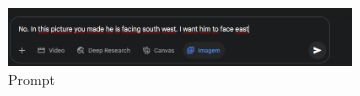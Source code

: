 \begin{figure}[htbp]
    \centering
    \caption{\small Processo da geração 16 do sprite em side view no Gemini Pro em julho/2025}
    \label{fig:geminiPro16}

    \begin{subfigure}{0.8\linewidth}
        \includegraphics[width=1\linewidth]{figs/geminiPro/chat11/tela2.PNG}
        \caption{\small Prompt}
        \label{fig:geminiPro16Prompt}
    \end{subfigure}
    \begin{subfigure}{0.3\linewidth}

\end{subfigure}
\end{figure}
